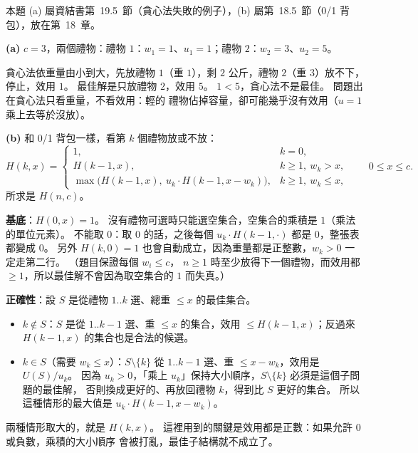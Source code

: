 \begin{pastsoln}
本題 (a) 屬資結書第~19.5~節（貪心法失敗的例子），(b) 屬第~18.5~節（0/1 背包），放在第~18~章。

\textbf{(a)} $c = 3$，兩個禮物：禮物 $1$：$w_1 = 1$、$u_1 = 1$；禮物 $2$：$w_2 = 3$、$u_2 = 5$。

貪心法依重量由小到大，先放禮物 $1$（重 $1$），剩 $2$ 公斤，禮物 $2$（重 $3$）放不下，停止，效用 $1$。
最佳解是只放禮物 $2$，效用 $5$。 $1 < 5$，貪心法不是最佳。 問題出在貪心法只看重量，不看效用：輕的
禮物佔掉容量，卻可能幾乎沒有效用（$u = 1$ 乘上去等於沒放）。

\textbf{(b)} 和 0/1 背包一樣，看第 $k$ 個禮物放或不放：
\[
H(k, x) =
\begin{cases}
1, & k = 0, \\
H(k - 1, x), & k \ge 1,\ w_k > x, \\
\max\bigl(H(k - 1, x),\ u_k \cdot H(k - 1, x - w_k)\bigr), & k \ge 1,\ w_k \le x,
\end{cases}
\qquad 0 \le x \le c.
\]
所求是 $H(n, c)$。

\textbf{基底}：$H(0, x) = 1$。 沒有禮物可選時只能選空集合，空集合的乘積是 $1$（乘法的單位元素）。
不能取 $0$：取 $0$ 的話，之後每個 $u_k \cdot H(k - 1, \cdot)$ 都是 $0$，整張表都變成 $0$。 另外
$H(k, 0) = 1$ 也會自動成立，因為重量都是正整數，$w_k > 0$ 一定走第二行。 （題目保證每個 $w_i \le c$，
$n \ge 1$ 時至少放得下一個禮物，而效用都 $\ge 1$，所以最佳解不會因為取空集合的 $1$ 而失真。）

\textbf{正確性}：設 $S$ 是從禮物 $1..k$ 選、總重 $\le x$ 的最佳集合。
\begin{itemize}
\item $k \notin S$：$S$ 是從 $1..k-1$ 選、重 $\le x$ 的集合，效用 $\le H(k - 1, x)$；反過來
$H(k - 1, x)$ 的集合也是合法的候選。
\item $k \in S$（需要 $w_k \le x$）：$S \setminus \{k\}$ 從 $1..k-1$ 選、重 $\le x - w_k$，效用是
$U(S)/u_k$。 因為 $u_k > 0$，「乘上 $u_k$」保持大小順序，$S \setminus \{k\}$ 必須是這個子問題的最佳解，
否則換成更好的、再放回禮物 $k$，得到比 $S$ 更好的集合。 所以這種情形的最大值是
$u_k \cdot H(k - 1, x - w_k)$。
\end{itemize}
兩種情形取大的，就是 $H(k, x)$。 這裡用到的關鍵是效用都是正數：如果允許 $0$ 或負數，乘積的大小順序
會被打亂，最佳子結構就不成立了。


\end{pastsoln}
